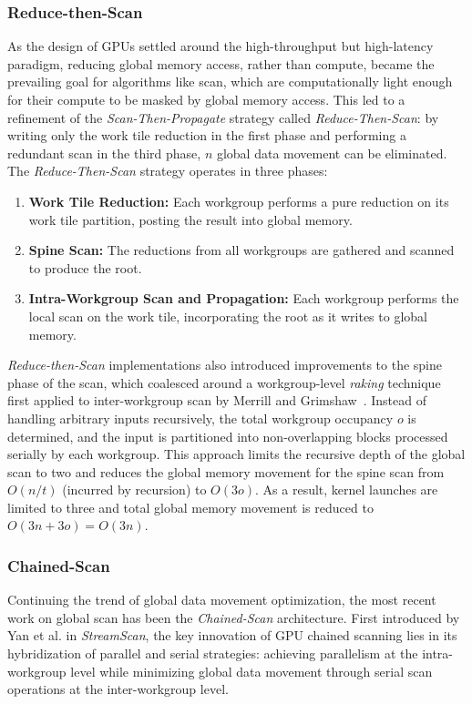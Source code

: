 \documentclass[sigconf]{acmart}
\begin{document}
\subsubsection{Reduce-then-Scan}
As the design of GPUs settled around the high-throughput but high-latency paradigm, reducing global memory access, rather than compute, became the prevailing goal for algorithms like scan, which are computationally light enough for their compute to be masked by global memory access. This led to a refinement of the \emph{Scan-Then-Propagate} strategy called \emph{Reduce-Then-Scan}\cite{Merrill Grimshaw, Ha and Han, Dotsenko, Breitbart}: by writing only the work tile reduction in the first phase and performing a redundant scan in the third phase, $n$ global data movement can be eliminated. The \emph{Reduce-Then-Scan} strategy operates in three phases:
\begin{enumerate}
  \item \textbf{Work Tile Reduction:} Each workgroup performs a pure reduction on its work tile partition, posting the result into global memory. 
  \item \textbf{Spine Scan:} The reductions from all workgroups are gathered and scanned to produce the root.
  \item \textbf{Intra-Workgroup Scan and Propagation:} Each workgroup performs the local scan on the work tile, incorporating the root as it writes to global memory.
\end{enumerate}
\emph{Reduce-then-Scan} implementations also introduced improvements to the spine phase of the scan, which coalesced around a workgroup-level \emph{raking} technique first applied to inter-workgroup scan by Merrill and Grimshaw~\cite{}. Instead of handling arbitrary inputs recursively, the total workgroup occupancy $o$ is determined, and the input is partitioned into non-overlapping blocks processed serially by each workgroup. This approach limits the recursive depth of the global scan to two and reduces the global memory movement for the spine scan from $O(n/t)$ (incurred by recursion) to $O(3o)$. As a result, kernel launches are limited to three and total global memory movement is reduced to $O(3n + 3o) = O(3n)$.

\subsubsection{Chained-Scan}
Continuing the trend of global data movement optimization, the most recent work on global scan has been the \emph{Chained-Scan} architecture. First introduced by Yan et al. in \emph{StreamScan}, the key innovation of GPU chained scanning lies in its hybridization of parallel and serial strategies: achieving parallelism at the intra-workgroup level while minimizing global data movement through serial scan operations at the inter-workgroup level.
\end{document}

